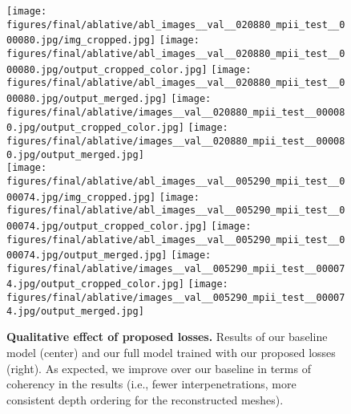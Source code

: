 \begin{figure*}[!t]
	\centering
    \texttt{[image: figures/final/ablative/abl\_images\_\_val\_\_020880\_mpii\_test\_\_000080.jpg/img\_cropped.jpg]}
    \texttt{[image: figures/final/ablative/abl\_images\_\_val\_\_020880\_mpii\_test\_\_000080.jpg/output\_cropped\_color.jpg]}
    \texttt{[image: figures/final/ablative/abl\_images\_\_val\_\_020880\_mpii\_test\_\_000080.jpg/output\_merged.jpg]}
    \texttt{[image: figures/final/ablative/images\_\_val\_\_020880\_mpii\_test\_\_000080.jpg/output\_cropped\_color.jpg]}
    \texttt{[image: figures/final/ablative/images\_\_val\_\_020880\_mpii\_test\_\_000080.jpg/output\_merged.jpg]}\\
    \texttt{[image: figures/final/ablative/abl\_images\_\_val\_\_005290\_mpii\_test\_\_000074.jpg/img\_cropped.jpg]}
    \texttt{[image: figures/final/ablative/abl\_images\_\_val\_\_005290\_mpii\_test\_\_000074.jpg/output\_cropped\_color.jpg]}
    \texttt{[image: figures/final/ablative/abl\_images\_\_val\_\_005290\_mpii\_test\_\_000074.jpg/output\_merged.jpg]}
    \texttt{[image: figures/final/ablative/images\_\_val\_\_005290\_mpii\_test\_\_000074.jpg/output\_cropped\_color.jpg]}
    \texttt{[image: figures/final/ablative/images\_\_val\_\_005290\_mpii\_test\_\_000074.jpg/output\_merged.jpg]}\\
  \vspace{-1mm}
    \hspace{40mm}  \hspace{56mm}   \hspace{12mm} \text{\color{white} \scriptsize}
	\vspace{-3mm}   
	\caption{{\bf Qualitative effect of proposed losses.}
Results of our baseline model (center) and our full model trained with our proposed losses (right). As expected, we improve over our baseline in terms of coherency in the results (i.e., fewer interpenetrations, more consistent depth ordering for the reconstructed meshes).
}
\label{fig:ablative}
\vspace{-2mm}
\end{figure*}
 
